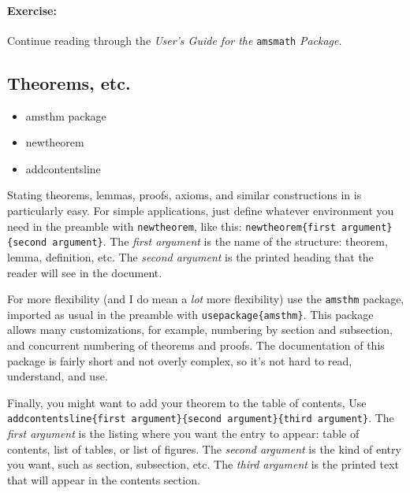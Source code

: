 		\paragraph{Exercise:}Continue reading through the \textit{User's Guide for the }\texttt{amsmath} \textit{Package}.

        \subsection{Theorems, etc.}
        \label{Theorems}
        
        \begin{framed}
            \begin{itemize}
                \item{amsthm package}
                \item{newtheorem}
                \item{addcontentsline}
            \end{itemize}
        \end{framed}

        Stating theorems, lemmas, proofs, axioms, and similar constructions in \Lx{} is particularly easy. For simple applications, just define whatever environment you need in the preamble with \texttt{newtheorem}, like this: \texttt{newtheorem\{first argument\}\{second argument\}}. The \textit{first argument} is the name of the structure: theorem, lemma, definition, etc. The \textit{second argument} is the printed heading that the reader will see in the document.

        For more flexibility (and I do mean a \textit{lot} more flexibility) use the \texttt{amsthm} package, imported as usual in the preamble with \texttt{usepackage\{amsthm\}}. This package allows many customizations, for example, numbering by section and subsection, and concurrent numbering of theorems and proofs. The documentation of this package is fairly short and not overly complex, so it's not hard to read, understand, and use.

        Finally, you might want to add your theorem to the table of contents, Use \texttt{addcontentsline\{first argument\}\{second argument\}\{third argument\}}. The \textit{first argument} is the listing where you want the entry to appear: table of contents, list of tables, or list of figures. The \textit{second argument} is the kind of entry you want, such as section, subsection, etc. The \textit{third argument} is the printed text that will appear in the contents section.

